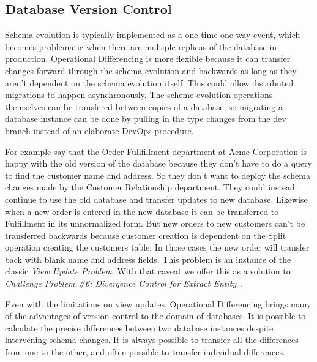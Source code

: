 \documentclass[english,submission]{programming}
\theoremstyle{definition}
\begin{document}
\subsection{Database Version Control}

Schema evolution is typically implemented as a one-time one-way event, which becomes problematic when there are multiple replicas of the database in production. Operational Differencing is more flexible because it can transfer changes forward through the schema evolution and backwards as long as they aren't dependent on the schema evolution itself. This could allow distributed migrations to happen asynchronously.
The scheme evolution operations themselves can be transfered between copies of a database, so migrating a database instance can be done by pulling in the type changes from the dev branch instead of an elaborate DevOps procedure.

For example say that the Order Fullfillment department at Acme Corporation is happy with the old version of the database because they don't have to do a query to find the customer name and address. So they don't want to deploy the schema changes made by the Customer Relationship department. They could instead continue to use the old database and transfer updates to new database. Likewise when a new order is entered in the new database it can be transferred to Fulfillment in its unnormalized form. But new orders to new customers can't be transferred backwards because customer creation is dependent on the \textsf{Split} operation creating the customers table. In those cases the new order will transfer back with blank name and address fields. This problem is an instance of the classic \textit{View Update Problem}\cite{Bancilhon81, Foster2007}. With that caveat we offer this as a solution to \textit{Challenge Problem \#6: Divergence Control for Extract Entity}~\cite{challenge-problems}.

Even with the limitations on view updates, Operational Differencing brings many of the advantages of version control to the domain of databases. It is possible to calculate the precise differences between two database instances despite intervening schema changes. It is always possible to transfer all the differences from one to the other, and often possible to transfer individual differences.
\end{document}
